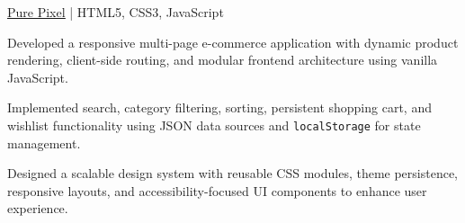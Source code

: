 \begin{cvproject}{\href{https://github.com/grvsnh/PurePixel}{\uline{Pure Pixel}} | HTML5, CSS3, JavaScript}{}
    \item Developed a responsive multi-page e-commerce application with dynamic product rendering, client-side routing, and modular frontend architecture using vanilla JavaScript.
    \item Implemented search, category filtering, sorting, persistent shopping cart, and wishlist functionality using JSON data sources and \texttt{localStorage} for state management.
    \item Designed a scalable design system with reusable CSS modules, theme persistence, responsive layouts, and accessibility-focused UI components to enhance user experience.
\end{cvproject}